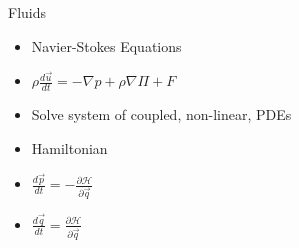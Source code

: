 \documentclass{beamer}
\begin{document}
			\begin{frame}[t]{Fluids}
				\begin{minipage}{0.45\textwidth}
					\begin{itemize}
						\item<2-> Navier-Stokes Equations
						\item<3-> $\rho\frac{d \vec u}{dt} = -\nabla p + \rho \nabla \Pi + F$
						\item<3-> Solve system of coupled, non-linear, PDEs
					\end{itemize}
				\end{minipage}
				\begin{minipage}{0.45\textwidth}
					\begin{itemize}
						\item<4-> Hamiltonian
						\item<5-> $\frac{d \vec p}{dt} = -\frac{\partial \mathcal{H}}{\partial \vec q}$
						\item<5-> $\frac{d \vec q}{dt} = \frac{\partial \mathcal{H}}{\partial \vec q}$
					\end{itemize}
				\end{minipage}
			\end{frame}
\end{document}
